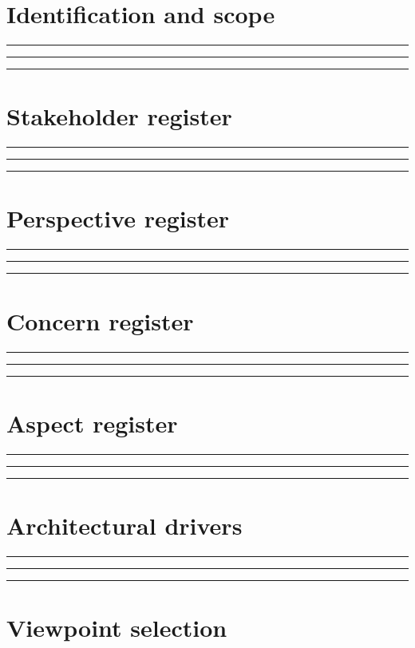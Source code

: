 \documentclass[11pt,letterpaper]{article}
\newcommand{\docsection}[1]{\Needspace{5\baselineskip}\section{#1}}
\begin{document}
\docsection{Identification and scope}
\noindent\rule{\linewidth}{0.35pt}\par\vspace{0.7em}
\noindent\rule{\linewidth}{0.35pt}\par\vspace{0.7em}
\noindent\rule{\linewidth}{0.35pt}\par\vspace{0.7em}
\docsection{Stakeholder register}
\noindent\rule{\linewidth}{0.35pt}\par\vspace{0.7em}
\noindent\rule{\linewidth}{0.35pt}\par\vspace{0.7em}
\noindent\rule{\linewidth}{0.35pt}\par\vspace{0.7em}
\docsection{Perspective register}
\noindent\rule{\linewidth}{0.35pt}\par\vspace{0.7em}
\noindent\rule{\linewidth}{0.35pt}\par\vspace{0.7em}
\noindent\rule{\linewidth}{0.35pt}\par\vspace{0.7em}
\docsection{Concern register}
\noindent\rule{\linewidth}{0.35pt}\par\vspace{0.7em}
\noindent\rule{\linewidth}{0.35pt}\par\vspace{0.7em}
\noindent\rule{\linewidth}{0.35pt}\par\vspace{0.7em}
\docsection{Aspect register}
\noindent\rule{\linewidth}{0.35pt}\par\vspace{0.7em}
\noindent\rule{\linewidth}{0.35pt}\par\vspace{0.7em}
\noindent\rule{\linewidth}{0.35pt}\par\vspace{0.7em}
\docsection{Architectural drivers}
\noindent\rule{\linewidth}{0.35pt}\par\vspace{0.7em}
\noindent\rule{\linewidth}{0.35pt}\par\vspace{0.7em}
\noindent\rule{\linewidth}{0.35pt}\par\vspace{0.7em}
\docsection{Viewpoint selection}
\end{document}
